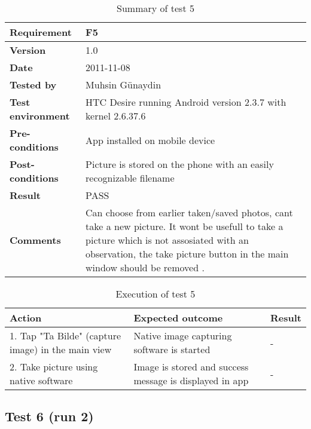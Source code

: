	\begin{table}[htb]
		\centering
		\begin{tabular}{|p{3.5cm}|p{7.0cm}|} \hline
			\textbf{Requirement} & F5 \\ \hline
			\textbf{Version} & 1.0 \\ \hline
			\textbf{Date} & 2011-11-08 \\ \hline
			\textbf{Tested by} & Muhsin Günaydin \\ \hline
			\textbf{Test environment} & HTC Desire running Android version 2.3.7 with kernel 2.6.37.6 \\ \hline
			\textbf{Pre-conditions} & App installed on mobile device \\ \hline
			\textbf{Post-conditions} & Picture is stored on the phone with an easily recognizable filename \\ \hline
			\textbf{Result} & PASS \\ \hline
			\textbf{Comments} & Can choose from earlier taken/saved photos, cant take a new picture. It wont be usefull to take a picture which is not assosiated with an observation, the take picture button in the main window should be removed .    \\ \hline
		\end{tabular}
		\caption{Summary of test 5}
	\end{table}

	\begin{table}[htb]
		\centering
		\begin{tabular}{|p{5.0cm}|p{5.0cm}|p{1cm}|}
			\hline \textbf{Action} & \textbf{Expected outcome} & \textbf{Result} \\ \hline
			1. Tap "Ta Bilde" (capture image) in the main view &
			Native image capturing software is started & 
			- \\ \hline

			2. Take picture using native software &
			Image is stored and success message is displayed in app &
			-\\ \hline
		\end{tabular}
		\caption{Execution of test 5}
	\end{table}

\newpage
\subsection*{Test 6 (run 2)}

